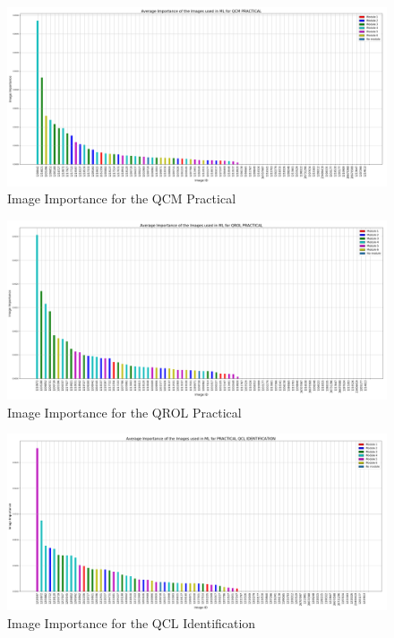 \documentclass[a4paper,11pt]{report}
\numberwithin{figure}{chapter} %
\begin{document}
     \begin{figure}[H]
      \centering
      \includegraphics[width=.99\linewidth]{plots/im_importance_QCM_PRACTICAL_2018-04-29_14_38_16.png}
      \caption{Image Importance for the QCM Practical}
      \label{fig:im_tp1}
      \end{figure}

      \begin{figure}[H]
      \centering
      \includegraphics[width=.99\linewidth]{plots/im_importance_QROL_PRACTICAL_2018-04-29_14_37_07.png}
      \caption{Image Importance for the QROL Practical}
      \label{fig:im_tp2}
      \end{figure}

      \begin{figure}[H]
      \centering
      \includegraphics[width=.99\linewidth]{plots/im_importance_PRACTICAL_QCL_IDENTIFICATION_2018-04-29_14_34_14.png}
      \caption{Image Importance for the QCL Identification}
      \label{fig:im_tp3}
      \end{figure}
\end{document}
